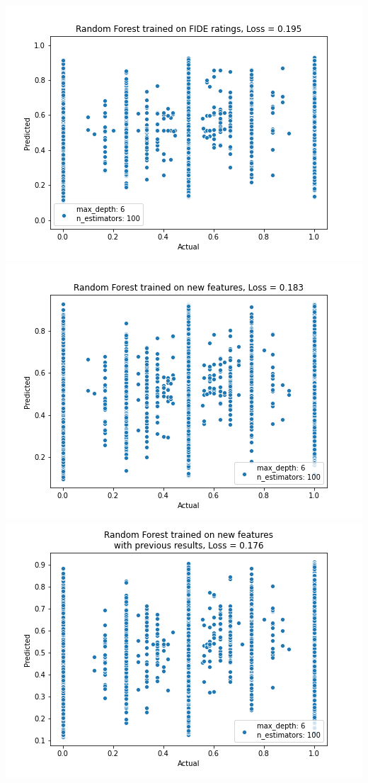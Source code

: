 \documentclass[12pt, letterpaper]{article}
\begin{document}
\begin{multicols}{2}
\includegraphics[width=\linewidth]{../figures/baseline_randomforest.png}
\includegraphics[width=\linewidth]{../figures/new_randomforest_iter_0.png}
\includegraphics[width=\linewidth]{../figures/new_randomforest_withprev_iter_0.png}
\end{multicols}
\end{document}
